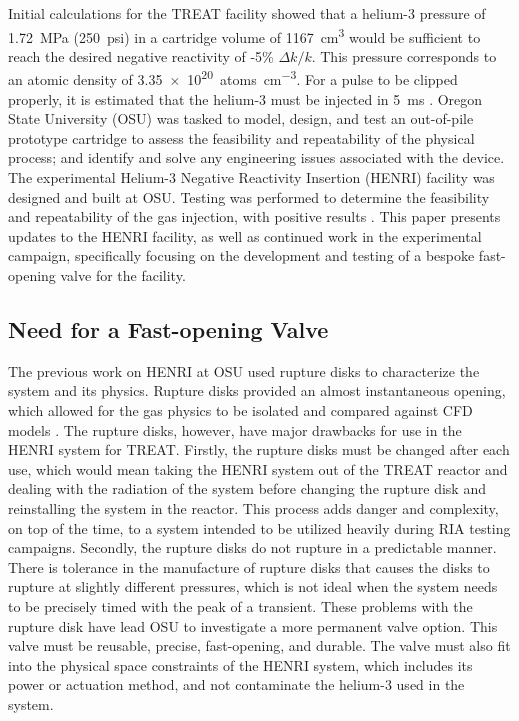 Initial calculations for the TREAT facility showed that a helium-3 pressure of \SI{1.72}{\mega\pascal} (\SI{250}{psi}) in a cartridge volume of \SI{1167}{\centi\meter^3} would be sufficient to reach the desired negative reactivity of -5\% $\Delta k/k$. This pressure corresponds to an atomic density of \SI{3.35e20}{atoms\per\centi\meter^3}. For a pulse to be clipped properly, it is estimated that the helium-3 must be injected in \SI{5}{\milli\second} \cite{BESS2019}. Oregon State University (OSU) was tasked to model, design, and test an out-of-pile prototype cartridge to assess the feasibility and repeatability of the physical process; and identify and solve any engineering issues associated with the device. The experimental Helium-3 Negative Reactivity Insertion (HENRI) facility was designed and built at OSU. Testing was performed to determine the feasibility and repeatability of the gas injection, with positive results \cite{HeNURETH}. This paper presents updates to the HENRI facility, as well as continued work in the experimental campaign, specifically focusing on the development and testing of a bespoke fast-opening valve for the facility.



\subsection{Need for a Fast-opening Valve} \label{ss:need for valve}

The previous work on HENRI at OSU \cite{HeNURETH} used rupture disks to characterize the system and its physics. Rupture disks provided an almost instantaneous opening, which allowed for the gas physics to be isolated and compared against CFD models \cite{CFDNureth}. The rupture disks, however, have major drawbacks for use in the HENRI system for TREAT. Firstly, the rupture disks must be changed after each use, which would mean taking the HENRI system out of the TREAT reactor and dealing with the radiation of the system before changing the rupture disk and reinstalling the system in the reactor. This process adds danger and complexity, on top of the time, to a system intended to be utilized heavily during RIA testing campaigns. Secondly, the rupture disks do not rupture in a predictable manner. There is tolerance in the manufacture of rupture disks that causes the disks to rupture at slightly different pressures, which is not ideal when the system needs to be precisely timed with the peak of a transient. These problems with the rupture disk have lead OSU to investigate a more permanent valve option. This valve must be reusable, precise, fast-opening, and durable. The valve must also fit into the physical space constraints of the HENRI system, which includes its power or actuation method, and not contaminate the helium-3 used in the system.


